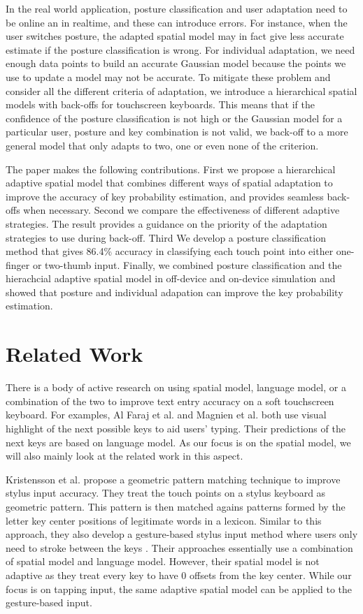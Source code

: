 \documentclass{sigchi}
\begin{document}
In the real world application, posture classification and user adaptation need to be
online an in realtime, and these can introduce errors. For instance, when the user switches posture,
the adapted spatial model may in fact give less accurate estimate if the posture classification
is wrong. For individual adaptation, we need enough data points to build
an accurate Gaussian model because the points we use to update a model may not be accurate. 
To mitigate these problem and consider all the different criteria of adaptation, we 
introduce a hierarchical spatial models with back-offs for touchscreen keyboards.  
This means that if the confidence of the posture classification is not high or the Gaussian model for a particular user, posture and key combination is 
not valid, we back-off to a more general model that only adapts to two, one or even none of 
the criterion. 

The paper makes the following contributions. First
we propose a hierarchical adaptive spatial model that combines different
ways of spatial adaptation to improve the accuracy of key probability estimation, and provides seamless back-offs when necessary.
Second we compare the effectiveness of different adaptive strategies.
The result provides a guidance on the priority of the adaptation strategies to use during 
back-off. Third We develop a posture classification method that gives 86.4\% accuracy in
classifying each touch point into either one-finger or two-thumb input. Finally, we 
combined posture classification and the hierachcial adaptive spatial model in off-device and 
on-device simulation and showed that posture and individual adapation can improve the key probability
estimation.

\section{Related Work}
There is a body of active research on using spatial model, language model, or a combination
of the two to improve text entry accuracy on a soft touchscreen keyboard. For examples, 
Al Faraj et al. \cite{AlFaraj:2009} and Magnien et al. \cite{Magnien:2004} both use
visual highlight of the next possible keys to aid users' typing. Their predictions of the next keys are
based on language model. As our focus is on the 
spatial model, we will also mainly look at the related work in this aspect.    

Kristensson et al. \cite{Kristensson:2005} propose a geometric pattern matching technique to improve 
stylus input accuracy. They treat the touch points on a stylus keyboard as geometric pattern. 
This pattern is then matched agains patterns formed by 
the letter key center positions of legitimate words in a lexicon. Similar to this approach,
they also develop a gesture-based stylus input method where users only need to stroke between the keys \cite{Kristensson:2004}.
Their approaches essentially use a combination of spatial model and language model. However, 
their spatial model is not adaptive as they treat every key to have 0 offsets from 
the key center. While our focus is on tapping input, the same adaptive spatial model
can be applied to the gesture-based input.
\end{document}
